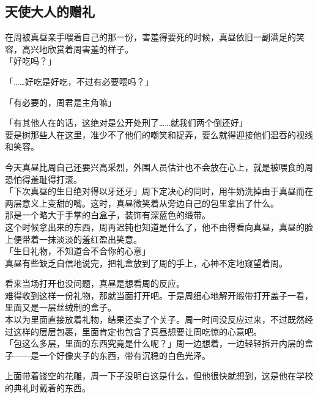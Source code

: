 \subsection{天使大人的赠礼}

在周被真昼亲手喂着自己的那一份，害羞得要死的时候，真昼依旧一副满足的笑容，高兴地欣赏着周害羞的样子。\\

「好吃吗？」

「……好吃是好吃，不过有必要喂吗？」

「有必要的，周君是主角嘛」

「有其他人在的话，这绝对是公开处刑了……就我们两个倒还好」\\

要是树那些人在这里，准少不了他们的嘲笑和捉弄，要么就得迎接他们温吞的视线和笑容。

今天真昼比周自己还要兴高采烈，外围人员估计也不会放在心上，就是被喂食的周恐怕得羞耻得打滚。\\

「下次真昼的生日绝对得以牙还牙」周下定决心的同时，用牛奶洗掉由于真昼而在两层意义上变甜的嘴。这时，真昼微笑着从旁边自己的包里拿出了什么。\\

那是一个略大于手掌的白盒子，装饰有深蓝色的缎带。\\

这个时候拿出来的东西，周再迟钝也知道是什么了，他不由得看向真昼，真昼的脸上便带着一抹淡淡的羞红盈出笑意。\\

「生日礼物，不知道合不合你的心意」\\

真昼有些缺乏自信地说完，把礼盒放到了周的手上，心神不定地窥望着周。

看来当场打开也没问题，真昼是想看周的反应。\\

难得收到这样一份礼物，那就当面打开吧。于是周细心地解开缎带打开盖子一看，里面又是一层丝绒制的盒子。\\

本以为里面直接放着礼物，结果还卖了个关子。周一时间没反应过来，不过既然经过这样的层层包裹，里面肯定也包含了真昼想要让周吃惊的心意吧。\\

「包这么多层，里面的东西究竟是什么呢？」周一边想着，一边轻轻拆开内层的盒子——是一个好像夹子的东西，带有沉稳的白色光泽。

上面带着镂空的花雕，周一下子没明白这是什么，但他很快就想到，这是他在学校的典礼时戴着的东西。\\

